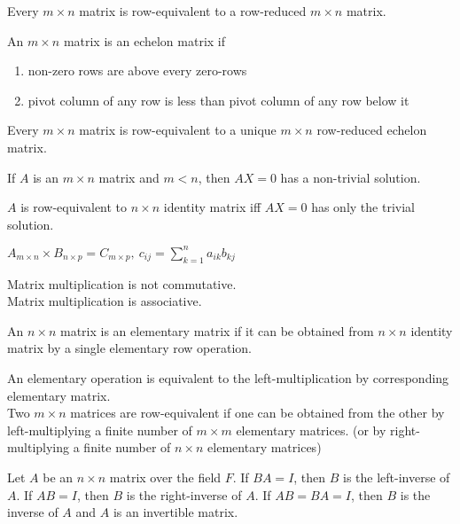 	\begin{remark}
		Every $m \times n$ matrix is row-equivalent to a row-reduced $m \times n$ matrix.
	\end{remark}
	\begin{definition}
		An $m \times n$ matrix is an echelon matrix if
		\begin{enumerate}
			\item non-zero rows are above every zero-rows
			\item pivot column of any row is less than pivot column of any row below it
		\end{enumerate}
	\end{definition}
	\begin{theorem}
		Every $m \times n$ matrix is row-equivalent to a unique $m \times n$ row-reduced echelon matrix.
	\end{theorem}
	\begin{theorem}
		If $A$ is an $m \times n$ matrix and $m < n$, then $AX=0$ has a non-trivial solution.
	\end{theorem}
	\begin{theorem}
		$A$ is row-equivalent to $n \times n$ identity matrix iff $AX=0$ has only the trivial solution.
	\end{theorem}
	\begin{definition}
		$A_{m \times n} \times B_{n \times p} = C_{m \times p},\ c_{ij} = \sum_{k=1}^n a_{ik}b_{kj}$
	\end{definition}
	\begin{remark}
		Matrix multiplication is not commutative.\\
		Matrix multiplication is associative.
	\end{remark}
	\begin{definition}
		An $n \times n$ matrix is an elementary matrix if it can be obtained from $n \times n$ identity matrix by a single elementary row operation.
	\end{definition}
	\begin{remark}
		An elementary operation is equivalent to the left-multiplication by corresponding elementary matrix.\\
		Two $m \times n$ matrices are row-equivalent if one can be obtained from the other by left-multiplying a finite number of $m \times m$ elementary matrices. (or by right-multiplying a finite number of $n \times n$ elementary matrices)
	\end{remark}
	\begin{definition}
		Let $A$ be an $n \times n$ matrix over the field $F$. If $BA = I$, then $B$ is the left-inverse of $A$. If $AB = I$, then $B$ is the right-inverse of $A$. If $AB = BA = I$, then $B$ is the inverse of $A$ and $A$ is an invertible matrix.
	\end{definition}
